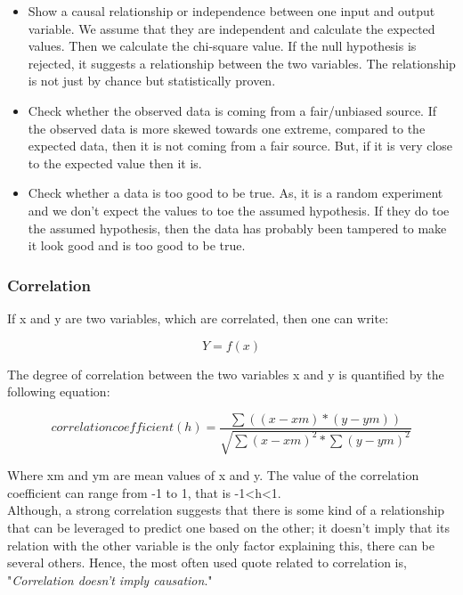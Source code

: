 \documentclass{article}
\numberwithin{equation}{section} %
\begin{document}
\begin{itemize}
	\item Show a causal relationship or independence between one input and output
	variable. We assume that they are independent and calculate the expected
	values. Then we calculate the chi-square value. If the null hypothesis
	is rejected, it suggests a relationship between the two variables. The
	relationship is not just by chance but statistically proven.
	
	\item Check whether the observed data is coming from a fair/unbiased source.
	If the observed data is more skewed towards one extreme, compared to the
	expected data, then it is not coming from a fair source. But, if it is very close to the expected value then it is.
	
	\item Check whether a data is too good to be true. As, it is a random experiment
	and we don't expect the values to toe the assumed hypothesis. If they do toe
	the assumed hypothesis, then the data has probably been tampered to make
	it look good and is too good to be true.
\end{itemize}

\subsubsection*{Correlation}

If x and y are two variables, which are correlated, then one can write:

\begin{equation*}
Y=f(x)
\end{equation*}

The degree of correlation between the two variables x and y is quantified by the
following equation:

\begin{equation*}
correlation coefficient ( h ) = \frac{\sum((x-xm)*(y-ym))}{\sqrt{\sum(x-xm)^2*\sum(y-ym)^2}}
\end{equation*}

Where xm and ym are mean values of x and y. The value of the correlation coefficient can range from -1 to 1, that is -1<h<1. \\

Although, a strong correlation suggests that there is some kind of a relationship
that can be leveraged to predict one based on the other; it doesn't imply that its
relation with the other variable is the only factor explaining this, there can be several others. Hence, the most often used quote related to correlation is, "\textit{Correlation doesn't imply causation}." \\
\end{document}
